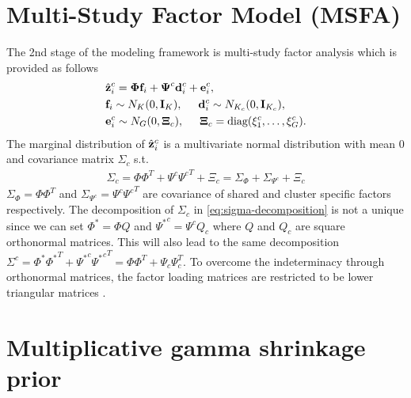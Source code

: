 \documentclass[
]{book}
\begin{document}
\hypertarget{multi-study-factor-model-msfa}{%
\section{Multi-Study Factor Model (MSFA)}\label{multi-study-factor-model-msfa}}

The 2nd stage of the modeling framework is multi-study factor analysis \citep{de2018bayesian} which is provided as follows
\begin{align}
\begin{split}
& \hat{\bf z}^{c}_{i} = \boldsymbol \Phi {\bf f}_{i} + \boldsymbol \Psi^{c} {\bf d}^{c}_{i} + {\bf e}^{c}_{i}, \\
& {\bf f}_{i} \sim N_{K}(0, {\bf I}_{K}), \hspace{0.5cm} {\bf d}^{c}_{i} \sim N_{K_{c}}(0,{\bf I}_{K_{c}}),\\
& {\bf e}^{c}_{i} \sim N_{G}(0,\boldsymbol \Xi_{c}), \hspace{0.5cm} \boldsymbol \Xi_{c} = \text{diag}(\xi^{c}_{1}, \dots, \xi^{c}_{G} ).
\end{split}
\label{eq:MSFA-supp}
\end{align}
The marginal distribution of \(\hat{\bf z}^{c}_{i}\) is a multivariate normal distribution with mean \(0\) and covariance matrix \(\Sigma_{c}\) s.t.
\begin{align}
\Sigma_{c} = \Phi \Phi^{T} + \Psi^{c} {\Psi^{c}}^{T} + \Xi_{c} = \Sigma_{\Phi} + \Sigma_{\Psi^{c}} + \Xi_{c}
\label{eq:sigma-decomposition}
\end{align}
\(\Sigma_{\Phi} = \Phi \Phi^{T}\) and \(\Sigma_{\Psi^{c}} = \Psi^{c} {\Psi^{c}}^{T}\) are covariance of shared and cluster specific factors respectively. The decomposition of \(\Sigma_{c}\) in \eqref{eq:sigma-decomposition} is not a unique since we can set \(\Phi^{*} = \Phi Q\) and \({\Psi^{*}}^{c} = \Psi^{c} Q_{c}\) where \(Q\) and \(Q_{c}\) are square orthonormal matrices. This will also lead to the same decomposition \(\Sigma^{c} = \Phi^{*} {\Phi^{*}}^{T} + {\Psi^{*}}^{c} {{\Psi^{*}}^{c}}^{T} = \Phi \Phi^{T} + \Psi_{c} \Psi_{c}^{T}\). To overcome the indeterminacy through orthonormal matrices, the factor loading matrices are restricted to be lower triangular matrices \citep{geweke1996measuring, lopes2004bayesian}.

\hypertarget{multiplicative-gamma-shrinkage-prior}{%
\section{Multiplicative gamma shrinkage prior}\label{multiplicative-gamma-shrinkage-prior}}
\end{document}
